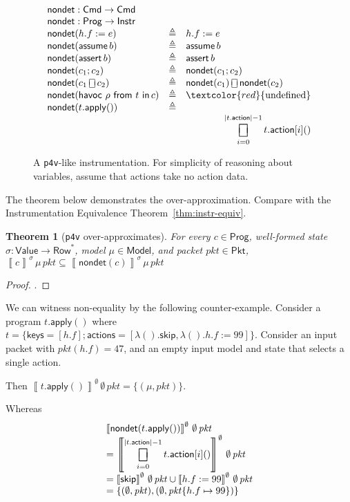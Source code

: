 \documentclass{article}
\newcommand{\pkt}{\mathit{pkt}}
\newcommand{\denote}[1]{\left\llbracket#1\right\rrbracket}
\newcommand{\Value}{\mathsf{Value}}
\newcommand{\Cmd}{\mathsf{Cmd}}
\newcommand{\Instr}{\mathsf{Instr}}
\newcommand{\Prog}{\mathsf{Prog}}
\newcommand{\Pkt}{\mathsf{Pkt}}
\newcommand{\Model}{\mathsf{Model}}
\newcommand{\Row}{\mathsf{Row}}
\newcommand{\action}{\mathsf{action}}
\newcommand{\actions}{\mathsf{actions}}
\newcommand{\keys}{\mathsf{keys}}
\newcommand{\assert}{\mathop{\mathsf{assert}}}
\newcommand{\assume}{\mathop{\mathsf{assume}}}
\newcommand{\apply}{\mathsf{apply}}
\newcommand{\choiceop}{\rotatebox[origin=c]{90}{$\sqsubset\!\!\!\sqsupset$}}
\newcommand{\choice}{\mathbin{\choiceop}}
\DeclareMathOperator*{\bigchoice}{\scalerel*{\choiceop}{\sum}}
\renewcommand{\choose}[2]{\mathop{\mathsf{havoc}~#1~\mathsf{from}~#2~\mathsf{in}}}
\newcommand{\SKIP}{\mathsf{skip}}
\newcommand{\nondet}{\mathsf{nondet}}
\newtheorem{theorem}{Theorem}
\begin{document}
\begin{figure}
  \[\begin{array}{l >{\triangleq}cl}
  \multicolumn{3}{l}{\nondet : \Cmd \to \Cmd} \\
  \multicolumn{3}{l}{\nondet : \Prog \to \Instr} \\
  \nondet(h.f := e) && h.f := e \\
  \nondet(\assume b) && \assume b \\
  \nondet(\assert b) && \assert b \\
  \nondet(c_1;c_2) && \nondet(c_1;c_2) \\
  \nondet(c_1 \choice c_2) && \nondet(c_1) \choice \nondet(c_2) \\
  \nondet(\choose \rho t c) && \textcolor{red}{\text{undefined}} \\
  \nondet(t.\apply()) && \\
  \multicolumn{3}{>{\qquad}r}{
    \displaystyle
    \bigchoice_{i = 0}^{|t.\action|-1}t.\action[i]()
  }
  \end{array}\]
  \caption{A \texttt{p4v}-like instrumentation. For simplicity of reasoning
    about variables, assume that actions take no action data. }
  \label{fig:p4vlike}
\end{figure}

The theorem below demonstrates the over-approximation. Compare with the Instrumentation Equivalence Theorem~\ref{thm:instr-equiv}.

\begin{theorem}[\texttt{p4v} over-approximates]
  \label{thm:p4v-over}
  For every $c \in \Prog$, well-formed state $\sigma : \Value \to \Row^* $,
  model $\mu \in \Model$, and packet $\pkt \in \Pkt$,
  $\denote{c}^\sigma\,\mu\,\pkt \subseteq \denote{\nondet(c)}^\sigma\,\mu\,\pkt$
\end{theorem}

\begin{proof}
.
\end{proof}

We can witness non-equality by the following counter-example. Consider a program
$t.\apply()$ where $t = \{\keys=[h.f];\actions=[\lambda().\SKIP, \lambda(). h.f :=
  99]\}$. Consider an input packet with $\pkt(h.f) = 47$, and an empty input
model and state that selects a single action.

Then $\denote{t.\apply()}^\emptyset\,\emptyset\,\pkt = \{(\mu,\pkt)\}$.

Whereas
\[\begin{array}{l}
\denote{\nondet(t.\apply())}^\emptyset\,\emptyset\,\pkt \\
= \denote{
    \displaystyle
    \bigchoice_{i = 0}^{|t.\action|-1} t.\action[i]()
}^\emptyset\,\emptyset\,\pkt \\
= \denote{\SKIP}^\emptyset\,\emptyset\,\pkt \cup \denote{h.f := 99}^\emptyset\,\emptyset\,\pkt\\
= \{(\emptyset,\pkt),(\emptyset,\pkt\{h.f\mapsto 99\})\}
\end{array}\]
\end{document}
